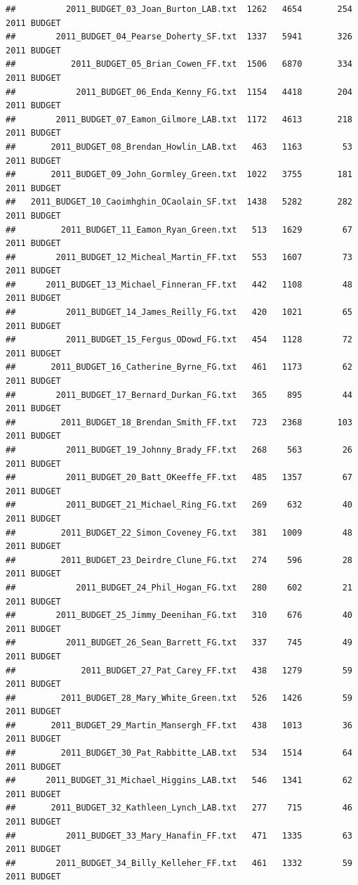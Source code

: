 \documentclass[11pt]{article}
\begin{document}
\begin{knitrout}
\begin{kframe}
\begin{verbatim}
##          2011_BUDGET_03_Joan_Burton_LAB.txt  1262   4654       254 2011 BUDGET
##        2011_BUDGET_04_Pearse_Doherty_SF.txt  1337   5941       326 2011 BUDGET
##           2011_BUDGET_05_Brian_Cowen_FF.txt  1506   6870       334 2011 BUDGET
##            2011_BUDGET_06_Enda_Kenny_FG.txt  1154   4418       204 2011 BUDGET
##        2011_BUDGET_07_Eamon_Gilmore_LAB.txt  1172   4613       218 2011 BUDGET
##       2011_BUDGET_08_Brendan_Howlin_LAB.txt   463   1163        53 2011 BUDGET
##       2011_BUDGET_09_John_Gormley_Green.txt  1022   3755       181 2011 BUDGET
##   2011_BUDGET_10_Caoimhghin_OCaolain_SF.txt  1438   5282       282 2011 BUDGET
##         2011_BUDGET_11_Eamon_Ryan_Green.txt   513   1629        67 2011 BUDGET
##        2011_BUDGET_12_Micheal_Martin_FF.txt   553   1607        73 2011 BUDGET
##      2011_BUDGET_13_Michael_Finneran_FF.txt   442   1108        48 2011 BUDGET
##          2011_BUDGET_14_James_Reilly_FG.txt   420   1021        65 2011 BUDGET
##          2011_BUDGET_15_Fergus_ODowd_FG.txt   454   1128        72 2011 BUDGET
##       2011_BUDGET_16_Catherine_Byrne_FG.txt   461   1173        62 2011 BUDGET
##        2011_BUDGET_17_Bernard_Durkan_FG.txt   365    895        44 2011 BUDGET
##         2011_BUDGET_18_Brendan_Smith_FF.txt   723   2368       103 2011 BUDGET
##          2011_BUDGET_19_Johnny_Brady_FF.txt   268    563        26 2011 BUDGET
##          2011_BUDGET_20_Batt_OKeeffe_FF.txt   485   1357        67 2011 BUDGET
##          2011_BUDGET_21_Michael_Ring_FG.txt   269    632        40 2011 BUDGET
##         2011_BUDGET_22_Simon_Coveney_FG.txt   381   1009        48 2011 BUDGET
##         2011_BUDGET_23_Deirdre_Clune_FG.txt   274    596        28 2011 BUDGET
##            2011_BUDGET_24_Phil_Hogan_FG.txt   280    602        21 2011 BUDGET
##        2011_BUDGET_25_Jimmy_Deenihan_FG.txt   310    676        40 2011 BUDGET
##          2011_BUDGET_26_Sean_Barrett_FG.txt   337    745        49 2011 BUDGET
##             2011_BUDGET_27_Pat_Carey_FF.txt   438   1279        59 2011 BUDGET
##         2011_BUDGET_28_Mary_White_Green.txt   526   1426        59 2011 BUDGET
##       2011_BUDGET_29_Martin_Mansergh_FF.txt   438   1013        36 2011 BUDGET
##         2011_BUDGET_30_Pat_Rabbitte_LAB.txt   534   1514        64 2011 BUDGET
##      2011_BUDGET_31_Michael_Higgins_LAB.txt   546   1341        62 2011 BUDGET
##       2011_BUDGET_32_Kathleen_Lynch_LAB.txt   277    715        46 2011 BUDGET
##          2011_BUDGET_33_Mary_Hanafin_FF.txt   471   1335        63 2011 BUDGET
##        2011_BUDGET_34_Billy_Kelleher_FF.txt   461   1332        59 2011 BUDGET

\end{verbatim}
\end{kframe}
\end{knitrout}
\end{document}
